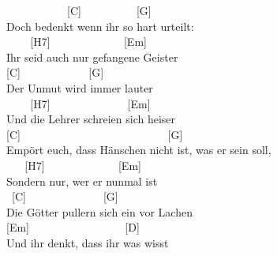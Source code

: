 \documentclass[
  letterpaper,
  twoside=false]{scrbook}
\begin{document}
~ ~ ~ ~ ~ ~ ~{[}C{]} ~ ~ ~ ~ ~ ~{[}G{]} ~ ~ ~ ~ ~ ~ ~\\
Doch bedenkt wenn ihr so hart urteilt:\\
\hspace*{0.333em} ~ ~ ~{[}H7{]} ~ ~ ~ ~ ~ ~ ~ ~{[}Em{]}\\
Ihr seid auch nur gefangene Geister\\
\hspace*{0.333em} {[}C{]} ~ ~ ~ ~ ~ ~ ~ {[}G{]}\\
Der Unmut wird immer lauter\\
\hspace*{0.333em} ~ ~ ~{[}H7{]} ~ ~ ~ ~ ~ ~ ~ ~ {[}Em{]}\\
Und die Lehrer schreien sich heiser\\
{[}C{]} ~ ~ ~ ~ ~ ~ ~ ~ ~ ~ ~ ~ ~ ~ ~ ~{[}G{]}\\
Empört euch, dass Hänschen nicht ist, was er sein soll,\\
\hspace*{0.333em} ~ ~ {[}H7{]} ~ ~ ~ ~ ~ ~ ~ ~{[}Em{]}\\
Sondern nur, wer er nunmal ist\\
\hspace*{0.333em} ~{[}C{]} ~ ~ ~ ~ ~ ~ ~ ~ {[}G{]}\\
Die Götter pullern sich ein vor Lachen\\
\hspace*{0.333em} {[}Em{]} ~ ~ ~ ~ ~ ~ ~ ~ ~ ~ {[}D{]}\\
Und ihr denkt, dass ihr was wisst
\end{document}

